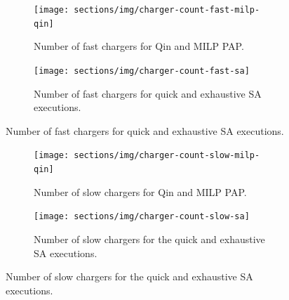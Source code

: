 \documentclass[11pt,a4paper,final]{article}
\begin{document}
\begin{figure}
    \begin{subfigure}[t]{\textwidth}
    \centering
        \texttt{[image: sections/img/charger-count-fast-milp-qin]}
        \caption{Number of fast chargers for Qin and MILP PAP.}
        \label{subfig:fast-charger-usage}
    \end{subfigure}

    \begin{subfigure}[t]{\textwidth}
    \centering
        \texttt{[image: sections/img/charger-count-fast-sa]}
        \caption{Number of fast chargers for quick and exhaustive SA executions.}
        \label{subfig:fast-charger-usage}
    \end{subfigure}
\end{figure}

\begin{figure}
    \begin{subfigure}[t]{\textwidth}
    \centering
        \texttt{[image: sections/img/charger-count-slow-milp-qin]}
        \caption{Number of slow chargers for Qin and MILP PAP.}
        \label{subfig:slow-charger-usage}
    \end{subfigure}
    \begin{subfigure}[t]{\textwidth}
    \centering
        \texttt{[image: sections/img/charger-count-slow-sa]}
        \caption{Number of slow chargers for the quick and exhaustive SA executions.}
        \label{subfig:slow-charger-usage-sa}
    \end{subfigure}
\end{figure}
\end{document}
